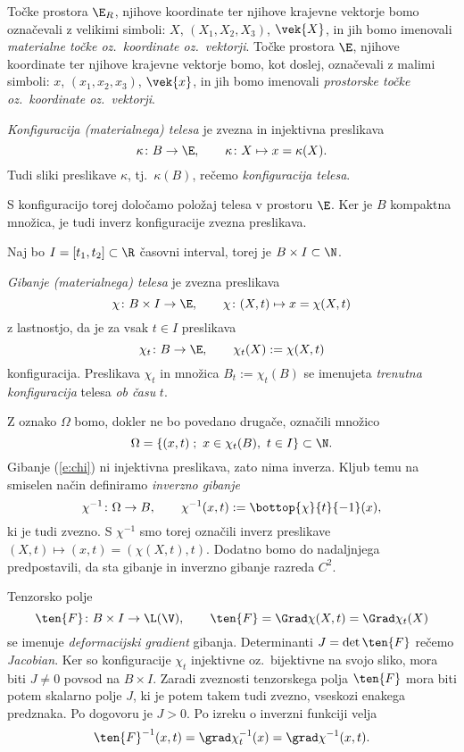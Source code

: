 Točke prostora $\E_R$, njihove koordinate ter njihove krajevne vektorje bomo označevali
z velikimi simboli: $X$, $(X_1,X_2,X_3)$, $\vek{X}$, in jih bomo imenovali
\emph{materialne točke oz.~koordinate oz.~vektorji}.
Točke prostora $\E$, njihove koordinate ter njihove krajevne vektorje bomo,
kot doslej, označevali z malimi simboli: $x$, $(x_1,x_2,x_3)$, $\vek{x}$, in jih bomo imenovali
\emph{prostorske točke oz.~koordinate oz.~vektorji}.

\begin{definicija}
	\emph{Konfiguracija (materialnega) telesa} je zvezna in injektivna preslikava
	\[ \kappa\colon B\to\E,\qquad \kappa\colon X\mapsto x=\kappa(X). \]
	Tudi sliki preslikave $\kappa$, tj.~$\kappa(B)$, rečemo \emph{konfiguracija telesa}.
\end{definicija}
S konfiguracijo torej določamo položaj telesa v prostoru $\E$. Ker je $B$ kompaktna
množica, je tudi inverz konfiguracije zvezna preslikava.

Naj bo $I=[t_1,t_2]\subset\R$ časovni interval, torej je $B\times I\subset\N$.
\begin{definicija}
	\emph{Gibanje (materialnega) telesa} je zvezna preslikava
	\begin{equation}\label{e:chi}
		\chi\colon B\times I\to\E,\qquad \chi\colon(X,t)\mapsto x=\chi(X,t)
	\end{equation}
	z lastnostjo, da je za vsak $t\in I$ preslikava
	\[ \chi_t\colon B\to\E, \qquad \chi_t(X):=\chi(X,t) \]
	konfiguracija. Preslikava $\chi_t$ in množica $ B_t:=\chi_t(B)$ se imenujeta
	\emph{trenutna konfiguracija} telesa \emph{ob času} $t$.
\end{definicija}

Z oznako $\Omega$ bomo, dokler ne bo povedano drugače, označili množico
\[ \Omega=\{(x,t)\;;\ x\in\chi_t(B),\ t\in I\}\subset\N. \]
Gibanje (\ref{e:chi}) ni injektivna preslikava, zato nima inverza. Kljub temu na smiselen
način definiramo \emph{inverzno gibanje}
\[
	\chi^{-1}\colon\Omega\to B,\qquad
	\chi^{-1}(x,t):=\bottop{\chi}{t}{-1}(x),
\]
ki je tudi zvezno. S $\chi^{-1}$ smo torej označili inverz preslikave
$(X,t)\mapsto(x,t)=(\chi(X,t),t)$. Dodatno bomo do nadaljnjega predpostavili, da sta gibanje
in inverzno gibanje razreda $C^2$.

Tenzorsko polje
\[
	\ten{F}\colon B\times I\to\L(\V),\qquad \ten{F}=\Grad\chi(X,t)=\Grad\chi_t(X)
\]
se imenuje \emph{deformacijski gradient} gibanja. Determinanti $J=\det\ten{F}$ 
rečemo \emph{Jacobian}. Ker so konfiguracije $\chi_t$
injektivne oz.~bijektivne na svojo sliko, mora biti $J\neq 0$ povsod na $B\times I$.
Zaradi zveznosti tenzorskega polja $\ten{F}$ mora biti potem skalarno polje $J$,
ki je potem takem tudi zvezno, vseskozi
enakega predznaka. Po dogovoru je $J>0$. Po izreku o inverzni funkciji velja
\[
	\ten{F}^{-1}(x,t)=\grad\chi_t^{-1}(x)=\grad\chi^{-1}(x,t).
\]


